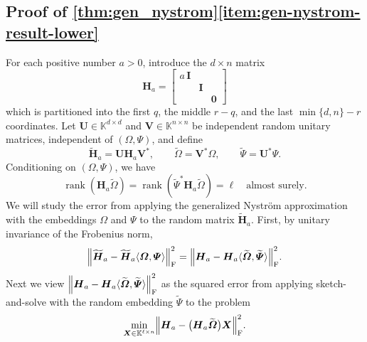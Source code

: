 \documentclass[11pt]{article}
\newcommand{\field}{\mathbb{K}}
\DeclareMathOperator{\rank}{rank}
\newcommand{\mat}[1]{\boldsymbol{#1}}
\newcommand{\norm}[1]{\mleft\| #1 \mright\|}
\newcommand{\Id}{\mathbf{I}}
\renewcommand{\tilde}[1]{\widetilde{#1}}
\theoremstyle{definition}
\numberwithin{equation}{section}
\begin{document}
\subsection{Proof of \texorpdfstring{\cref{thm:gen_nystrom}\ref{item:gen-nystrom-result-lower}}{Theorem 4.2(b)}} \label{sec:proof_gen_nystrom_lower}

For each positive number $a > 0$, introduce the $d \times n$ matrix
%
\begin{equation*}
    \mat{H}_a = \begin{bmatrix}
        a\,\Id & & \\
        & \Id & \\
        & & \mat{0}
    \end{bmatrix}
\end{equation*}
%
which is partitioned into the first $q$, the middle $r - q$, and the last $\min\{d,n\} - r$ coordinates.
Let $\mat{U}\in\field^{d\times d}$ and
$\mat{V}\in\field^{n\times n}$ be independent random unitary matrices,
independent of $(\mat{\varOmega},\mat{\varPsi})$, and define
\begin{equation*}
    \tilde{\mat{H}}_a=\mat{U}\mat{H}_a\mat{V}^*,
    \qquad
    \tilde{\mat{\varOmega}}=\mat{V}^*\mat{\varOmega},
    \qquad
    \tilde{\mat{\varPsi}}=\mat{U}^*\mat{\varPsi}.
\end{equation*}
Conditioning on $(\mat{\varOmega},\mat{\varPsi})$, we have
\begin{equation*}
    \rank(\mat{H}_a\tilde{\mat{\varOmega}}) =
    \rank(\tilde{\mat{\varPsi}}^*\mat{H}_a\tilde{\mat{\varOmega}})
    = \ell
    \quad\text{almost surely}.
\end{equation*}
We will study the error from applying the generalized Nystr\"om approximation with the embeddings $\mat{\varOmega}$ and $\mat{\varPsi}$ to the random matrix $\mat{\tilde{H}}_a$.
First, by unitary invariance of the Frobenius norm,
\begin{equation*}
    \norm{\tilde{\mat{H}}_a
    - \tilde{\mat{H}}_a\langle \mat{\varOmega}, \mat{\varPsi} \rangle}_{\rm F}^2
    = \norm{\mat{H}_a
    - \mat{H}_a\langle \tilde{\mat{\varOmega}}, \tilde{\mat{\varPsi}} \rangle}_{\rm F}^2.
\end{equation*}
Next we view $\norm{\mat{H}_a
- \mat{H}_a\langle \tilde{\mat{\varOmega}}, \tilde{\mat{\varPsi}} \rangle}_{\rm F}^2$ as the squared error from applying sketch-and-solve with the random embedding $\tilde{\mat{\varPsi}}$ to the problem
\begin{equation*}
    \min_{\mat{X} \in \field^{\ell \times n}} \norm{\mat{H}_a
    - \bigl(\mat{H}_a \tilde{\mat{\varOmega}}\bigr) \mat{X}}_{\rm F}^2.
\end{equation*}
\end{document}
